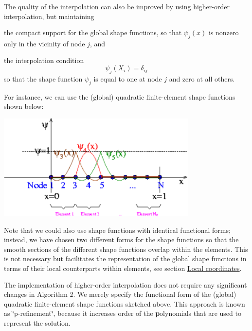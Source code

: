 The quality of the interpolation can also be improved by using higher-\/order interpolation, but maintaining
\begin{DoxyItemize}
\item the compact support for the global shape functions, so that $ \psi_j(x) $ is nonzero only in the vicinity of node $ j $, and
\item the interpolation condition \[ \psi_j(X_i) = \delta_{ij} \] so that the shape function $ \psi_j $ is equal to one at node $ j $ and zero at all others.
\end{DoxyItemize}For instance, we can use the (global) quadratic finite-\/element shape functions shown below\+:  
\begin{DoxyImage}
\includegraphics[width=0.75\textwidth]{1Dmesh_with_quadratic_shape_fcts}
\end{DoxyImage}
 Note that we could also use shape functions with identical functional forms; instead, we have chosen two different forms for the shape functions so that the smooth sections of the different shape functions overlap within the elements. This is not necessary but facilitates the representation of the global shape functions in terms of their local counterparts within elements, see section \hyperlink{index_local_coords}{Local coordinates}.

The implementation of higher-\/order interpolation does not require any significant changes in Algorithm 2. We merely specify the functional form of the (global) quadratic finite-\/element shape functions sketched above. This approach is known as \char`\"{}p-\/refinement\char`\"{}, because it increases order of the {\bfseries p}olynomials that are used to represent the solution.



 

